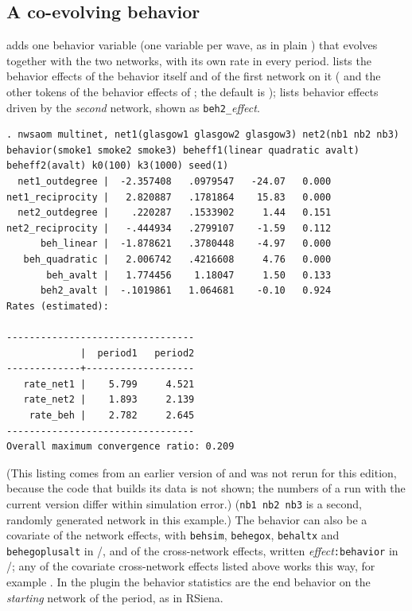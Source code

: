 \subsection{A co-evolving behavior}\label{sec:mn-behavior}

 adds one behavior variable (one variable per wave, as in plain \nwsaom{}) that evolves together with the two networks, with its own rate in every period.  lists the behavior effects of the behavior itself and of the first network on it ( and the other tokens of the behavior effects of \nwsaom{}; the default is );  lists behavior effects driven by the \emph{second} network, shown as \texttt{beh2\_}\emph{effect}.
\begin{lstlisting}
. nwsaom multinet, net1(glasgow1 glasgow2 glasgow3) net2(nb1 nb2 nb3) behavior(smoke1 smoke2 smoke3) beheff1(linear quadratic avalt) beheff2(avalt) k0(100) k3(1000) seed(1)
  net1_outdegree |  -2.357408   .0979547   -24.07   0.000
net1_reciprocity |   2.820887   .1781864    15.83   0.000
  net2_outdegree |    .220287   .1533902     1.44   0.151
net2_reciprocity |   -.444934   .2799107    -1.59   0.112
      beh_linear |  -1.878621   .3780448    -4.97   0.000
   beh_quadratic |   2.006742   .4216608     4.76   0.000
       beh_avalt |   1.774456    1.18047     1.50   0.133
      beh2_avalt |  -.1019861   1.064681    -0.10   0.924
Rates (estimated):

---------------------------------
             |  period1   period2
-------------+-------------------
   rate_net1 |    5.799     4.521
   rate_net2 |    1.893     2.139
    rate_beh |    2.782     2.645
---------------------------------
Overall maximum convergence ratio: 0.209
\end{lstlisting}
(This listing comes from an earlier version of \nwsaom{} and was not rerun for this edition, because the code that builds its data is not shown; the numbers of a run with the current version differ within simulation error.)
(\texttt{nb1 nb2 nb3} is a second, randomly generated network in this example.) The behavior can also be a covariate of the network effects, with \texttt{behsim}, \texttt{behegox}, \texttt{behaltx} and \texttt{behegoplusalt} in /, and of the cross-network effects, written \emph{effect}\texttt{:behavior} in /; any of the covariate cross-network effects listed above works this way, for example . In the plugin the behavior statistics are the end behavior on the \emph{starting} network of the period, as in RSiena.


